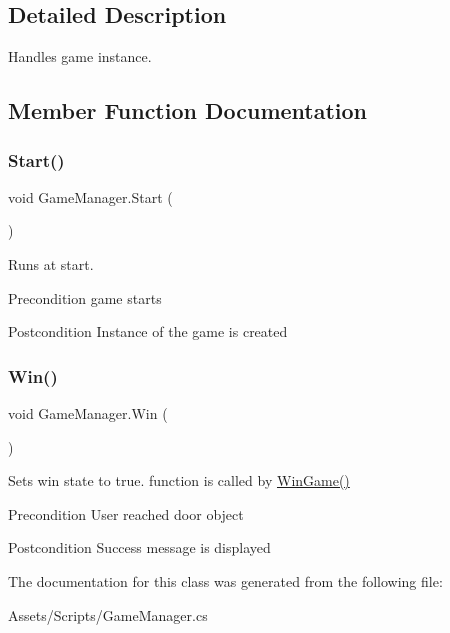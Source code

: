 \subsection{Detailed Description}
Handles game instance. 

\subsection{Member Function Documentation}
\mbox{\label{class_game_manager_a5ccfacd027ad08eeb4ff1f25a7f59c98}} 
\subsubsection{\texorpdfstring{Start()}{Start()}}
{\footnotesize\ttfamily void Game\+Manager.\+Start (\begin{DoxyParamCaption}{ }\end{DoxyParamCaption})\hspace{0.3cm}{\ttfamily [inline]}}

Runs at start. \begin{DoxyPrecond}{Precondition}
game starts 
\end{DoxyPrecond}
\begin{DoxyPostcond}{Postcondition}
Instance of the game is created 
\end{DoxyPostcond}
\mbox{\label{class_game_manager_a76a27f36d082e328bd1c7748d8832816}} 
\subsubsection{\texorpdfstring{Win()}{Win()}}
{\footnotesize\ttfamily void Game\+Manager.\+Win (\begin{DoxyParamCaption}{ }\end{DoxyParamCaption})\hspace{0.3cm}{\ttfamily [inline]}}

Sets win state to true. function is called by \mbox{\hyperlink{class_win_game}{Win\+Game()}} \begin{DoxyPrecond}{Precondition}
User reached door object 
\end{DoxyPrecond}
\begin{DoxyPostcond}{Postcondition}
Success message is displayed 
\end{DoxyPostcond}


The documentation for this class was generated from the following file\+:\begin{DoxyCompactItemize}
\item 
Assets/\+Scripts/Game\+Manager.\+cs\end{DoxyCompactItemize}
